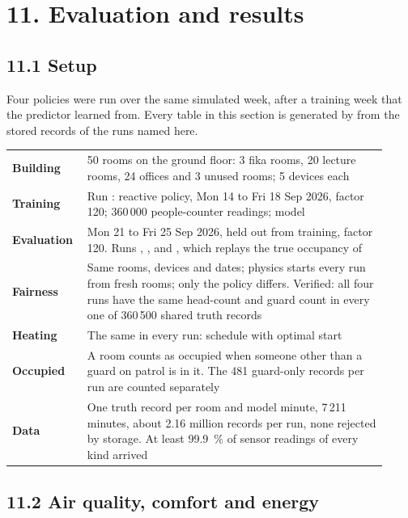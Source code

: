 \section{11. Evaluation and results}

\subsection{11.1 Setup}

Four policies were run over the same simulated week, after a training week
that the predictor learned from. Every table in this section is generated by
 from the stored records of the runs named here.

\begin{longtable}[]{@{}L{0.16\linewidth}L{0.76\linewidth}@{}}
\toprule
\endhead
\textbf{Building} & 50 rooms on the ground floor: 3 fika rooms, 20 lecture rooms, 24 offices and 3 unused rooms; 5 devices each \\
\textbf{Training} & Run : reactive policy, Mon 14 to Fri 18 Sep 2026, factor 120; 360\,000 people-counter readings; model  \\
\textbf{Evaluation} & Mon 21 to Fri 25 Sep 2026, held out from training, factor 120. Runs , ,  and , which replays the true occupancy of  \\
\textbf{Fairness} & Same rooms, devices and dates; physics starts every run from fresh rooms; only the policy differs. Verified: all four runs have the same head-count and guard count in every one of 360\,500 shared truth records \\
\textbf{Heating} & The same in every run: schedule with optimal start \\
\textbf{Occupied} & A room counts as occupied when someone other than a guard on patrol is in it. The 481 guard-only records per run are counted separately \\
\textbf{Data} & One truth record per room and model minute, 7\,211 minutes, about 2.16 million records per run, none rejected by storage. At least 99.9~\% of sensor readings of every kind arrived \\
\bottomrule
\end{longtable}

\subsection{11.2 Air quality, comfort and energy}

